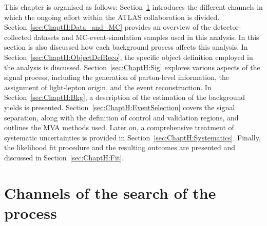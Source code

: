 This chapter is organised as follows:
Section~\ref{sec:ChaptH:Intro} introduces the different channels in which the ongoing effort within the ATLAS collaboration is divided.
Section~\ref{sec:ChaptH:Data_and_MC} provides an overview of 
the detector-collected datasets and MC-event-simulation samples used in this analysis. In this section is also discussed how
each background process affects this analysis.
In Section~\ref{sec:ChaptH:ObjectDefReco}, the specific object definition employed in the analysis is discussed. 
Section~\ref{sec:ChaptH:Sig} explores various aspects of the signal process, including the generation of parton-level information, 
the assignment of light-lepton origin, and the event reconstruction. 
In Section~\ref{sec:ChaptH:Bkg}, a description 
of the estimation of the background yields is presented.
Section~\ref{sec:ChaptH:EventSelection} covers the signal separation, along with the definition of 
control and validation regions, and outlines the MVA methods used.
Later on, a comprehensive treatment of systematic uncertainties is provided in Section~\ref{sec:ChaptH:Systematics}.
Finally, the likelihood fit procedure and the resulting outcomes are presented and discussed in Section~\ref{sec:ChaptH:Fit}.


\section{Channels of the search of the \tHq process}
\label{sec:ChaptH:Intro}



